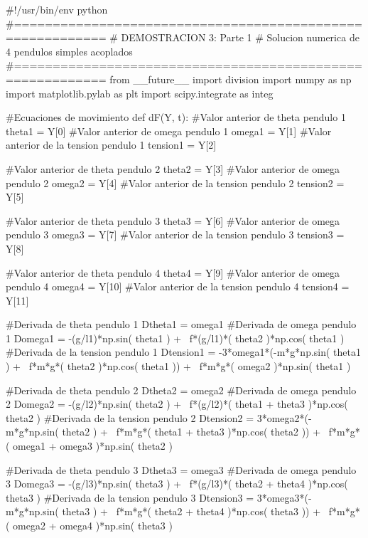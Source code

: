 \begin{listing}[style=python]
#!/usr/bin/env python
#==========================================================
# DEMOSTRACION 3: Parte 1
# Solucion numerica de 4 pendulos simples acoplados
#==========================================================
from __future__ import division
import numpy as np
import matplotlib.pylab as plt
import scipy.integrate as integ

#Ecuaciones de movimiento
def dF(Y, t):
    #Valor anterior de theta pendulo 1
    theta1 = Y[0]
    #Valor anterior de omega pendulo 1
    omega1 = Y[1]
    #Valor anterior de la tension pendulo 1
    tension1 = Y[2]
    
    #Valor anterior de theta pendulo 2
    theta2 = Y[3]
    #Valor anterior de omega pendulo 2
    omega2 = Y[4]
    #Valor anterior de la tension pendulo 2
    tension2 = Y[5]
    
    #Valor anterior de theta pendulo 3
    theta3 = Y[6]
    #Valor anterior de omega pendulo 3
    omega3 = Y[7]
    #Valor anterior de la tension pendulo 3
    tension3 = Y[8]
    
    #Valor anterior de theta pendulo 4
    theta4 = Y[9]
    #Valor anterior de omega pendulo 4
    omega4 = Y[10]
    #Valor anterior de la tension pendulo 4
    tension4 = Y[11]
    
    #Derivada de theta pendulo 1
    Dtheta1 = omega1
    #Derivada de omega pendulo 1
    Domega1 = -(g/l1)*np.sin( theta1 ) + \
    f*(g/l1)*( theta2 )*np.cos( theta1 )
    #Derivada de la tension pendulo 1
    Dtension1 = -3*omega1*(-m*g*np.sin( theta1 ) + \
    f*m*g*( theta2 )*np.cos( theta1 )) + \
    f*m*g*( omega2 )*np.sin( theta1 )
    
    #Derivada de theta pendulo 2
    Dtheta2 = omega2
    #Derivada de omega pendulo 2
    Domega2 = -(g/l2)*np.sin( theta2 ) + \
    f*(g/l2)*( theta1 + theta3 )*np.cos( theta2 )
    #Derivada de la tension pendulo 2
    Dtension2 = 3*omega2*(-m*g*np.sin( theta2 ) + \
    f*m*g*( theta1 + theta3 )*np.cos( theta2 )) + \
    f*m*g*( omega1 + omega3 )*np.sin( theta2 )
    
    #Derivada de theta pendulo 3
    Dtheta3 = omega3
    #Derivada de omega pendulo 3
    Domega3 = -(g/l3)*np.sin( theta3 ) + \
    f*(g/l3)*( theta2 + theta4 )*np.cos( theta3 )
    #Derivada de la tension pendulo 3
    Dtension3 = 3*omega3*(-m*g*np.sin( theta3 ) + \
    f*m*g*( theta2 + theta4 )*np.cos( theta3 )) + \
    f*m*g*( omega2 + omega4 )*np.sin( theta3 )
    

\end{listing}
